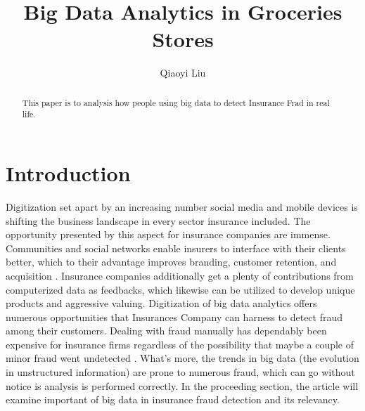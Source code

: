 \documentclass[sigconf]{acmart}
\begin{document}
\author{Qiaoyi Liu}


\title{Big Data Analytics in Groceries Stores}

\renewcommand{\shortauthors}{Q. Liu}

\begin{abstract}
This paper is to analysis how people using big data to detect Insurance Frad in real life.
\end{abstract}


\maketitle

\section{Introduction}

 Digitization set apart by an increasing number social media and mobile devices is shifting the business landscape in every sector insurance included. The opportunity presented by this aspect for insurance companies are immense. Communities and social networks enable insurers to interface with their clients better, which to their advantage improves branding, customer retention, and acquisition \cite{1}. Insurance companies additionally get a plenty of contributions from computerized data as feedbacks, which likewise can be utilized to develop unique products and aggressive valuing. Digitization of big data analytics offers numerous opportunities that Insurances Company can harness to detect fraud among their customers. Dealing with fraud manually has dependably been expensive for insurance firms regardless of the possibility that maybe a couple of minor fraud went undetected \cite{2}. What's more, the trends in big data (the evolution in unstructured information) are prone to numerous fraud, which can go without notice is analysis is performed correctly. In the proceeding section, the article will examine important of big data in insurance fraud detection and its relevancy.  
\end{document}
